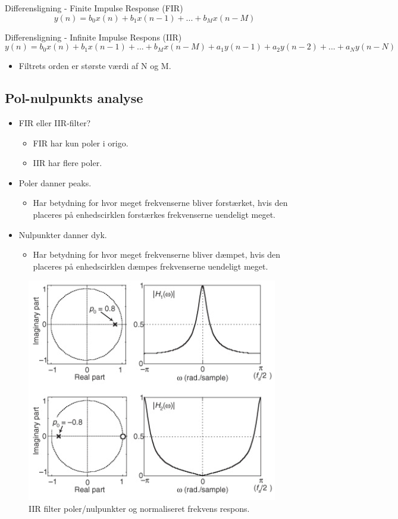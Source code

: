 \documentclass[danish]{article}
\begin{document}
Differensligning - Finite Impulse Response (FIR)
\begin{equation}
y(n) = b_0 x(n) + b_1 x(n-1) + ... + b_M x(n-M)
\end{equation}

Differensligning - Infinite Impulse Respons (IIR)
\begin{equation}
y(n) = b_0 x(n) + b_1 x(n-1) + ... + b_M x(n-M) + a_1 y(n-1) + a_2 y(n-2) + ... + a_N y(n-N)
\end{equation}

\begin{itemize}
	\item Filtrets orden er største værdi af N og M.
\end{itemize}

\subsection{Pol-nulpunkts analyse}
\begin{itemize}
	\item FIR eller IIR-filter?
	\begin{itemize}
		\item FIR har kun poler i origo.
		\item IIR har flere poler.
	\end{itemize}
	\item Poler danner peaks.
	\begin{itemize}
		\item Har betydning for hvor meget frekvenserne bliver forstærket, hvis den placeres på enhedscirklen forstærkes frekvenserne uendeligt meget.
	\end{itemize}
	\item Nulpunkter danner dyk.
	\begin{itemize}
		\item Har betydning for hvor meget frekvenserne bliver dæmpet, hvis den placeres på enhedscirklen dæmpes frekvenserne uendeligt meget.
	\end{itemize}
\end{itemize}

\begin{figure}[H]
	\centering
	\includegraphics[width=0.4\linewidth]{graphics/iir_pz1}
	\caption{IIR filter poler/nulpunkter og normaliseret frekvens respons.}
	\label{fig:iir_pz1}
\end{figure}
\end{document}
